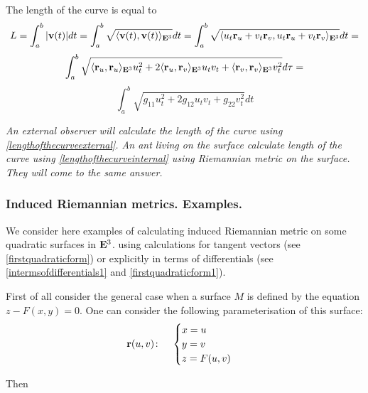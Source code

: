 \documentclass[12pt]{article}
\theoremstyle{theorem}
\numberwithin{equation}{section}
\begin{document}
The length of the curve is equal to
\begin{equation}\label{lengthofthecurveexternal}
L=\int_a^b |{\bf v}(t)|d t= \int_a^b\sqrt
{\langle {\bf v}(t),{\bf v}(t)\rangle_{{\bf E}^3}}d t = \int_a^b\sqrt
{\langle u_t{\bf r}_u+v_t{\bf r}_v,u_t{\bf r}_u+v_t{\bf r}_v\rangle_{{\bf E}^3}}dt=
\end{equation}
           $$
\int_a^b\sqrt {\langle{\bf r}_u,{\bf r}_u\rangle_{{\bf E}^3}u_t^2+2\langle{\bf r}_u,{\bf r}_v\rangle_{{\bf E}^3}u_tv_t+\langle{\bf r}_v,{\bf r}_v\rangle_{{\bf E}^3}v_t^2}d\tau=
           $$
\begin{equation}\label{lengthofthecurveinternal}
  \int_a^b\sqrt {g_{11} u_t^2+2g_{12}u_tv_t+g_{22}v_t^2}dt
\end{equation}

{\it An external observer will calculate the length of the curve using
\eqref{lengthofthecurveexternal}.  An ant living on the surface calculate
length of the curve using
\eqref{lengthofthecurveinternal} using  Riemannian
metric on the surface. They will come to the same answer.}



\subsubsection{Induced Riemannian metrics. Examples.}

We consider here examples of calculating induced Riemannian metric
on some quadratic surfaces in ${\bf E}^3$.
using calculations for tangent vectors (see \eqref{firstquadraticform}) or
explicitly in terms of differentials (see \eqref{intermsofdifferentials1} and \eqref{firstquadraticform1}).




\m

First of all  consider  the general case when
 a surface $M$ is defined by the
 equation $z-F(x,y)=0$. One can consider the following parameterisation
 of this surface:
\begin{equation}\label{surface}
  {\bf r}(u,v)\colon\quad
  \begin{cases}
  x=u\\
  y=v\\
  z=F(u,v)
  \end{cases}
\end{equation}

Then
\end{document}
